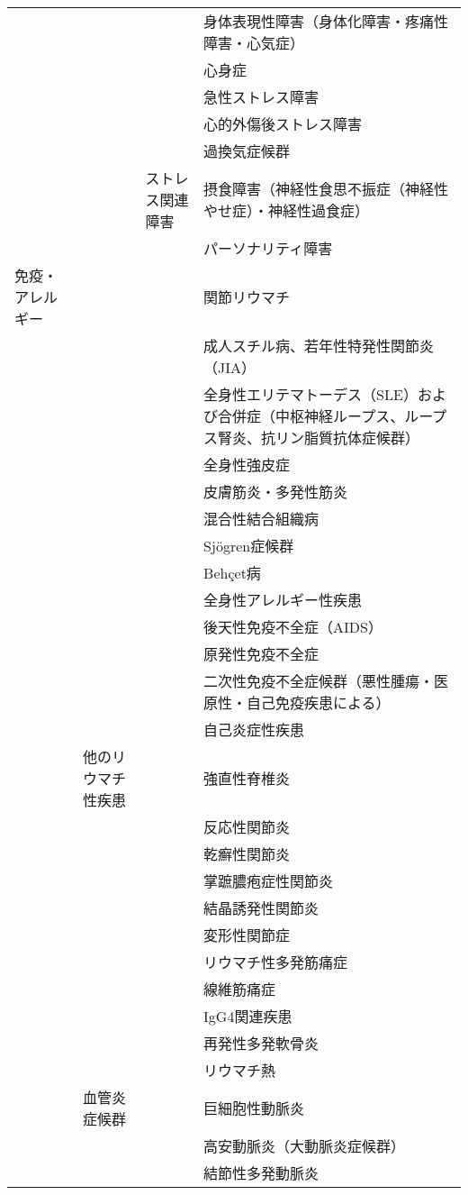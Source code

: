 \begin{xltabular}{\linewidth}{XXXX}
 &  &  & 身体表現性障害（身体化障害・疼痛性障害・心気症） \\
 &  &  & 心身症 \\
 &  &  & 急性ストレス障害 \\
 &  &  & 心的外傷後ストレス障害 \\
 &  &  & 過換気症候群 \\
 &  & ストレス関連障害 & 摂食障害（神経性食思不振症（神経性やせ症）・神経性過食症） \\
 &  &  & パーソナリティ障害 \\
免疫・アレルギー &  &  & 関節リウマチ \\
 &  &  & 成人スチル病、若年性特発性関節炎（JIA） \\
 &  &  & 全身性エリテマトーデス（SLE）および合併症（中枢神経ループス、ループス腎炎、抗リン脂質抗体症候群） \\
 &  &  & 全身性強皮症 \\
 &  &  & 皮膚筋炎・多発性筋炎 \\
 &  &  & 混合性結合組織病 \\
 &  &  & Sjögren症候群 \\
 &  &  & Behçet病 \\
 &  &  & 全身性アレルギー性疾患 \\
 &  &  & 後天性免疫不全症（AIDS） \\
 &  &  & 原発性免疫不全症 \\
 &  &  & 二次性免疫不全症候群（悪性腫瘍・医原性・自己免疫疾患による） \\
 &  &  & 自己炎症性疾患 \\
 & 他のリウマチ性疾患 &  & 強直性脊椎炎 \\
 &  &  & 反応性関節炎 \\
 &  &  & 乾癬性関節炎 \\
 &  &  & 掌蹠膿疱症性関節炎 \\
 &  &  & 結晶誘発性関節炎 \\
 &  &  & 変形性関節症 \\
 &  &  & リウマチ性多発筋痛症 \\
 &  &  & 線維筋痛症 \\
 &  &  & IgG4関連疾患 \\
 &  &  & 再発性多発軟骨炎 \\
 &  &  & リウマチ熱 \\
 & 血管炎症候群 &  & 巨細胞性動脈炎 \\
 &  &  & 高安動脈炎（大動脈炎症候群） \\
 &  &  & 結節性多発動脈炎 \\

\end{xltabular}
